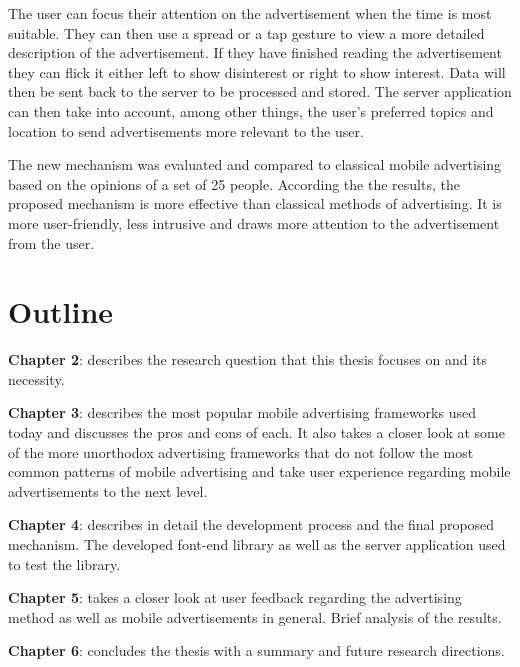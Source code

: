 The user can focus their attention on the advertisement when the time is most suitable. They can then use a spread or a tap gesture to view a more detailed description of the advertisement. If they have finished reading the advertisement they can flick it either left to show disinterest or right to show interest. Data will then be sent back to the server to be processed and stored. The server application can then take into account, among other things, the user's preferred topics and location to send advertisements more relevant to the user.

The new mechanism was evaluated and compared to classical mobile advertising based on the opinions of a set of 25 people. According the the results, the proposed mechanism is more effective than classical methods of advertising. It is more user-friendly, less intrusive and draws more attention to the advertisement from the user.

\section{Outline}

\noindent \textbf{Chapter 2}: describes the research question that this thesis focuses on and its necessity.

\noindent \textbf{Chapter 3}: describes the most popular mobile advertising frameworks used today and discusses the pros and cons of each. It also takes a closer look at some of the more unorthodox advertising frameworks that do not follow the most common patterns of mobile advertising and take user experience regarding mobile advertisements to the next level.

\noindent \textbf{Chapter 4}: describes in detail the development process and the final proposed mechanism. The developed font-end library as well as the server application used to test the library.

\noindent \textbf{Chapter 5}: takes a closer look at user feedback regarding the advertising method as well as mobile advertisements in general. Brief analysis of the results.

\noindent \textbf{Chapter 6}: concludes the thesis with a summary and future research directions.